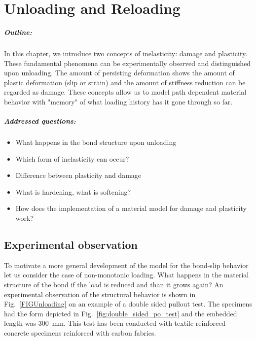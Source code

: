 \documentclass[main.tex]{subfiles}
\begin{document}
\chapter{Unloading and Reloading}
\label{LEC:unloading}

\paragraph{Outline:}
In this chapter, we introduce two concepts of inelasticity: damage and plasticity. These fundamental phenomena can be experimentally observed and distinguished upon unloading. The amount of persisting deformation shows the amount of plastic deformation (slip or strain) and the amount of stiffness reduction can be regarded as damage. These concepts allow us to model path dependent material behavior with "memory" of what loading history has it gone through so far.  
\paragraph{Addressed questions:}
\begin{itemize}
\item 
What happens in the bond structure upon unloading
\item 
Which form of inelasticity can occur?
\item 
Difference between plasticity and damage
\item 
What is hardening, what is softening?
\item 
How does the implementation of a material model for damage and plasticity work?
\end{itemize}

\section{Experimental observation}
To motivate a more general development of the model for the bond-slip behavior let us consider the case of non-monotonic loading. What happens in the material structure of the bond if the load is reduced and than it grows again? An experimental observation of the structural behavior is shown in Fig.~\ref{FIGUnloading} on an example of a double sided pullout test. The specimens had the form depicted in 
Fig.~\ref{fig:double_sided_po_test} and the embedded length was 300~mm.
This test has been conducted with textile reinforced concrete specimens reinforced with carbon fabrics. 
\end{document}
